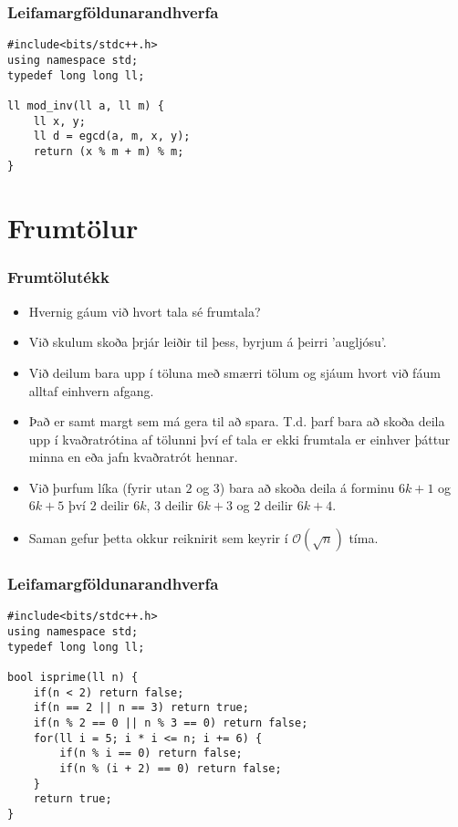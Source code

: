 \documentclass{beamer}
\begin{document}
\begin{frame}[fragile]
\frametitle{Leifamargföldunarandhverfa}

\begin{verbatim}
#include<bits/stdc++.h>
using namespace std;
typedef long long ll;

ll mod_inv(ll a, ll m) {
    ll x, y;
    ll d = egcd(a, m, x, y);
    return (x % m + m) % m; 
}
\end{verbatim}

\end{frame}

\section[Frumtölur]{Frumtölur}

\begin{frame}
\frametitle{Frumtölutékk}

\begin{itemize}

\item<1-> Hvernig gáum við hvort tala sé frumtala?

\item<2-> Við skulum skoða þrjár leiðir til þess, byrjum á þeirri 'augljósu'.

\item<3-> Við deilum bara upp í töluna með smærri tölum og sjáum hvort við fáum alltaf einhvern afgang.

\item<4-> Það er samt margt sem má gera til að spara. T.d. þarf bara að skoða deila upp í kvaðratrótina af tölunni því ef tala er ekki frumtala er einhver þáttur minna en eða jafn kvaðratrót hennar.

\item<5-> Við þurfum líka (fyrir utan $2$ og $3$) bara að skoða deila á forminu $6k + 1$ og $6k + 5$ því $2$ deilir $6k$, $3$ deilir $6k + 3$ og $2$ deilir $6k + 4$.

\item<6-> Saman gefur þetta okkur reiknirit sem keyrir í $\mathcal{O}(\sqrt{n})$ tíma.

\end{itemize}

\end{frame}

\begin{frame}[fragile]
\frametitle{Leifamargföldunarandhverfa}

\begin{verbatim}
#include<bits/stdc++.h>
using namespace std;
typedef long long ll;

bool isprime(ll n) {
    if(n < 2) return false;
    if(n == 2 || n == 3) return true;
    if(n % 2 == 0 || n % 3 == 0) return false;
    for(ll i = 5; i * i <= n; i += 6) {
        if(n % i == 0) return false;
        if(n % (i + 2) == 0) return false;
    }
    return true;
}
\end{verbatim}

\end{frame}
\end{document}
